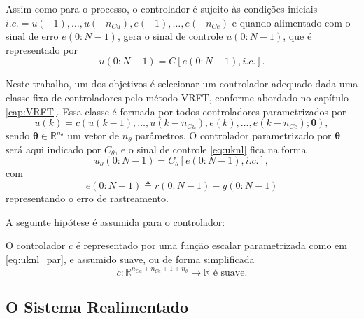 Assim como para o processo, o controlador é sujeito às condições iniciais $i.c.= u(-1), \ldots, u(-n_{C u}), e(-1), \ldots, e(-n_{C e})$
e quando alimentado com o sinal de erro $e(0{:}N-1)$, gera o sinal de controle $u(0{:}N-1)$, que é representado por
\begin{equation}
   u(0{:}N-1)=C[e(0{:}N-1), i.c.].
\label{eq:Cnl}
\end{equation}

Neste trabalho, um dos objetivos é selecionar um controlador adequado dada uma classe fixa de controladores pelo método VRFT, conforme abordado no capítulo \ref{cap:VRFT}. Essa classe é formada por todos controladores parametrizados por
\begin{equation}
   u(k)=c\left(u(k-1), \ldots, u(k-n_{C u}), e(k), \ldots, e(k-n_{C e}); \bm{\theta}\right),
\label{eq:uknl_par}
\end{equation}
sendo $\bm{\theta} \in \mathbb{R}^{n_\theta}$ um vetor de $n_{\theta}$ parâmetros. O controlador parametrizado por $\bm{\theta}$ será aqui indicado por $C_{\theta}$, e o sinal de controle \eqref{eq:uknl} fica na forma 
\begin{equation}
   u_{\theta}(0{:}N-1)=C_{\theta}[e(0{:}N-1), i.c.],
\label{eq:utheta}
\end{equation}
com
\begin{equation}
   e(0{:} N-1)\triangleq r(0{:} N-1)-y(0{:} N-1)
\label{eq:erro}
\end{equation}
representando o erro de rastreamento.

A seguinte hipótese é assumida para o controlador:
\begin{assum}
   O controlador $c$ é representado por uma função escalar parametrizada como em \eqref{eq:uknl_par}, e assumido suave, ou de forma simplificada
   \begin{equation}
      c:\mathbb{R}^{n_{Cu}+n_{Ce}+1+n_{\theta}} \mapsto \mathbb{R} \text{ é suave}.
      \label{eq:assumcon}
   \end{equation}
\end{assum}



\subsection{O Sistema Realimentado}%
\label{sub:o_sistema_realimentado}

